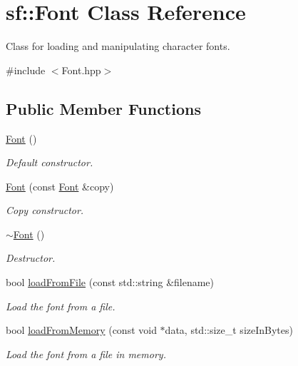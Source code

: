 \hypertarget{classsf_1_1_font}{\section{sf\+:\+:Font Class Reference}
\label{classsf_1_1_font}
}


Class for loading and manipulating character fonts.  




{\ttfamily \#include $<$Font.\+hpp$>$}

\subsection*{Public Member Functions}
\begin{DoxyCompactItemize}
\item 
\hyperlink{classsf_1_1_font_a506404655b8869ed60d1e7709812f583}{Font} ()
\begin{DoxyCompactList}\small\item\em Default constructor. \end{DoxyCompactList}\item 
\hyperlink{classsf_1_1_font_a72d7322b355ee2f1be4500f530e98081}{Font} (const \hyperlink{classsf_1_1_font}{Font} \&copy)
\begin{DoxyCompactList}\small\item\em Copy constructor. \end{DoxyCompactList}\item 
\hyperlink{classsf_1_1_font_aa18a3c62e6e01e9a21c531b5cad4b7f2}{$\sim$\+Font} ()
\begin{DoxyCompactList}\small\item\em Destructor. \end{DoxyCompactList}\item 
bool \hyperlink{classsf_1_1_font_ab020052ef4e01f6c749a85571c0f3fd1}{load\+From\+File} (const std\+::string \&filename)
\begin{DoxyCompactList}\small\item\em Load the font from a file. \end{DoxyCompactList}\item 
bool \hyperlink{classsf_1_1_font_abf2f8d6de31eb4e1db02e061c323e346}{load\+From\+Memory} (const void $\ast$data, std\+::size\+\_\+t size\+In\+Bytes)
\begin{DoxyCompactList}\small\item\em Load the font from a file in memory. \end{DoxyCompactList}\item 

\end{DoxyCompactItemize}
